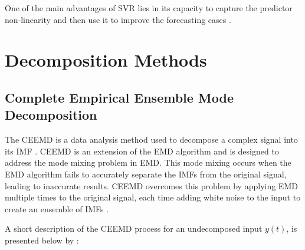 One of the main advantages of \ac{SVR} lies in its capacity to capture the predictor non-linearity and then use it to improve the forecasting cases \cite{drucker1997Support}.

\section{Decomposition Methods}

\subsection{Complete Empirical Ensemble Mode Decomposition}
The \ac{CEEMD} is a data analysis method used to decompose a complex signal into its \ac{IMF} \cite{zhang2021Combined}. \ac{CEEMD} is an extension of the \ac{EMD} algorithm \cite{huang1998Empirical} and is designed to address the mode mixing problem in \ac{EMD}. This mode mixing occurs when the \ac{EMD} algorithm fails to accurately separate the \ac{IMF}s from the original signal, leading to inaccurate results. \ac{CEEMD} overcomes this problem by applying \ac{EMD} multiple times to the original signal, each time adding white noise to the input to create an ensemble of \ac{IMF}s \cite{zhang2021Combined}.

A short description of the \ac{CEEMD} process for an undecomposed input $y(t)$, is presented below by :

